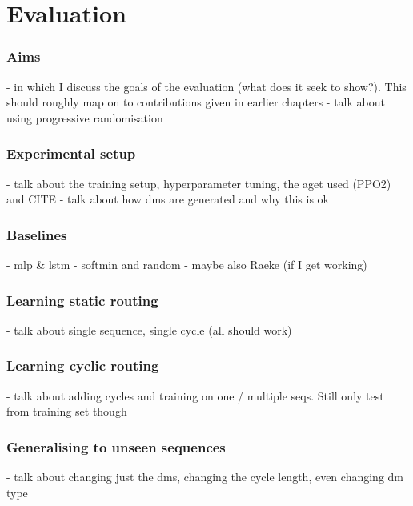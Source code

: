 \chapter{Evaluation}
\label{chapter:evaluation}

\subsection{Aims}

- in which I discuss the goals of the evaluation (what does it seek to show?). This should roughly map on to contributions given in earlier chapters
- talk about using progressive randomisation

\subsection{Experimental setup}

- talk about the training setup, hyperparameter tuning, the aget used (PPO2) and CITE
- talk about how dms are generated and why this is ok

\subsection{Baselines}

- mlp \& lstm
- softmin and random
- maybe also Raeke (if I get working)

\subsection{Learning static routing}

- talk about single sequence, single cycle (all should work)

\subsection{Learning cyclic routing}

- talk about adding cycles and training on one / multiple seqs. Still only test from training set though

\subsection{Generalising to unseen sequences}

- talk about changing just the dms, changing the cycle length, even changing dm type

